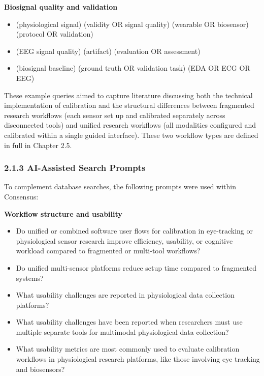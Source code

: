 \documentclass[
]{article}
\begin{document}
\textbf{Biosignal quality and validation}

\begin{itemize}
\item
  (physiological signal) (validity OR signal quality) (wearable OR biosensor) (protocol OR validation)
\item
  (EEG signal quality) (artifact) (evaluation OR assessment)
\item
  (biosignal baseline) (ground truth OR validation task) (EDA OR ECG OR EEG)
\end{itemize}

These example queries aimed to capture literature discussing both the technical implementation of calibration and the structural differences between fragmented research workflows (each sensor set up and calibrated separately across disconnected tools) and unified research workflows (all modalities configured and calibrated within a single guided interface). These two workflow types are defined in full in Chapter 2.5.

\hypertarget{ai-assisted-search-prompts}{%
\subsubsection{2.1.3 AI-Assisted Search Prompts}\label{ai-assisted-search-prompts}}

To complement database searches, the following prompts were used within Consensus:

\textbf{Workflow structure and usability}

\begin{itemize}
\item
  Do unified or combined software user flows for calibration in eye-tracking or physiological sensor research improve efficiency, usability, or cognitive workload compared to fragmented or multi-tool workflows?
\item
  Do unified multi-sensor platforms reduce setup time compared to fragmented systems?
\item
  What usability challenges are reported in physiological data collection platforms?
\item
  What usability challenges have been reported when researchers must use multiple separate tools for multimodal physiological data collection?
\item
  What usability metrics are most commonly used to evaluate calibration workflows in physiological research platforms, like those involving eye tracking and biosensors?
\end{itemize}
\end{document}
